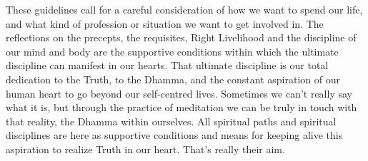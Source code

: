 These guidelines call for a careful consideration of how we want to spend our life, and what kind of profession or situation we want to get involved in. The reflections on the precepts, the requisites, Right Livelihood and the discipline of our mind and body are the supportive conditions within which the ultimate discipline can manifest in our hearts. That ultimate discipline is our total dedication to the Truth, to the Dhamma, and the constant aspiration of our human heart to go beyond our self-centred lives. Sometimes we can't really say what it is, but through the practice of meditation we can be truly in touch with that reality, the Dhamma within ourselves. All spiritual paths and spiritual disciplines are here as supportive conditions and means for keeping alive this aspiration to realize Truth in our heart. That's really their aim.
